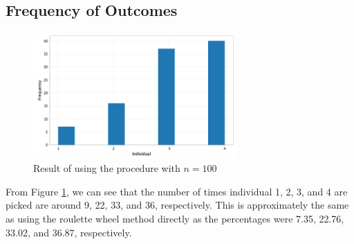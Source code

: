 \subsection{Frequency of Outcomes}

\begin{figure}[ht]
    \centering
    \includegraphics[width=0.69\textwidth]{../images/p1/roulette_histogram.png}
    \caption{Result of using the procedure with \(n=100\)}
    \label{fig:roulette-outcome}
\end{figure}

From Figure \ref{fig:roulette-outcome}, we can see that the number of times individual 1, 2, 3, and 4 are picked are around 9, 22, 33, and 36, respectively. This is approximately the same as using the roulette wheel method directly as the percentages were 7.35, 22.76, 33.02, and 36.87, respectively.
